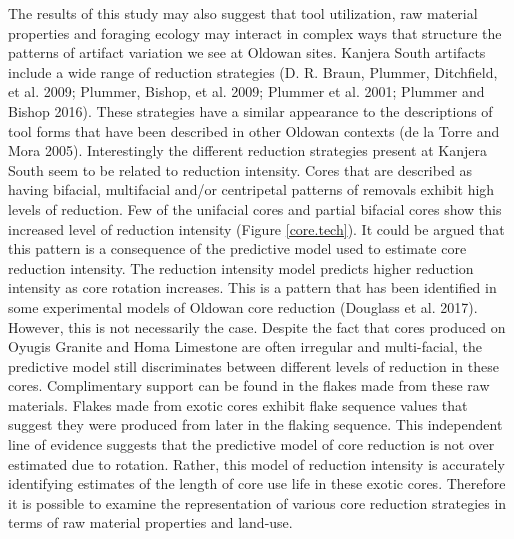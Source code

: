 \documentclass[]{elsarticle} %
\begin{document}
The results of this study may also suggest that tool utilization, raw
material properties and foraging ecology may interact in complex ways
that structure the patterns of artifact variation we see at Oldowan
sites. Kanjera South artifacts include a wide range of reduction
strategies (D. R. Braun, Plummer, Ditchfield, et al. 2009; Plummer,
Bishop, et al. 2009; Plummer et al. 2001; Plummer and Bishop 2016).
These strategies have a similar appearance to the descriptions of tool
forms that have been described in other Oldowan contexts (de la Torre
and Mora 2005). Interestingly the different reduction strategies present
at Kanjera South seem to be related to reduction intensity. Cores that
are described as having bifacial, multifacial and/or centripetal
patterns of removals exhibit high levels of reduction. Few of the
unifacial cores and partial bifacial cores show this increased level of
reduction intensity (Figure \ref{core.tech}). It could be argued that
this pattern is a consequence of the predictive model used to estimate
core reduction intensity. The reduction intensity model predicts higher
reduction intensity as core rotation increases. This is a pattern that
has been identified in some experimental models of Oldowan core
reduction (Douglass et al. 2017). However, this is not necessarily the
case. Despite the fact that cores produced on Oyugis Granite and Homa
Limestone are often irregular and multi-facial, the predictive model
still discriminates between different levels of reduction in these
cores. Complimentary support can be found in the flakes made from these
raw materials. Flakes made from exotic cores exhibit flake sequence
values that suggest they were produced from later in the flaking
sequence. This independent line of evidence suggests that the predictive
model of core reduction is not over estimated due to rotation. Rather,
this model of reduction intensity is accurately identifying estimates of
the length of core use life in these exotic cores. Therefore it is
possible to examine the representation of various core reduction
strategies in terms of raw material properties and land-use.
\end{document}
